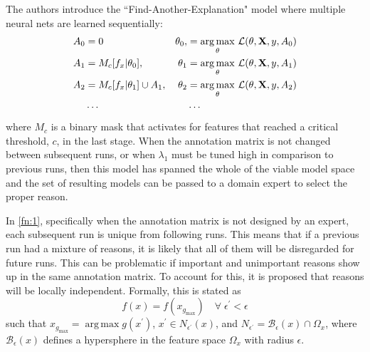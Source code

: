 \documentclass[twoside,11pt]{article}
\DeclareMathOperator*{\argmax}{arg\,max}
\begin{document}
The authors introduce the ``Find-Another-Explanation" model where multiple neural nets are learned sequentially:
\begin{align*}
A_0 & = 0 & \theta_0, & = \argmax_\theta \, \mathcal{L}(\theta, \vb{X}, y, A_0)\\
A_1 & = M_c[f_x|\theta_0], & \theta_1 & = \argmax_\theta \, \mathcal{L}(\theta, \vb{X}, y, A_1)\\
A_2 & = M_c[f_x|\theta_1]\cup A_1, & \theta_2 & = \argmax_\theta \, \mathcal{L}(\theta, \vb{X}, y, A_2)\\
&\cdots & &\cdots
\end{align*}
where $M_c$ is a binary mask that activates for features that reached a critical threshold, $c$, in the last stage. When the annotation matrix is not changed between subsequent runs, or when $\lambda_1$ must be tuned high in comparison to previous runs, then this model has spanned the whole of the viable model space and the set of resulting models can be passed to a  domain expert to select the proper reason. 

In \cref{fn:1}, specifically when the annotation matrix is not designed by an expert, each subsequent run is unique from following runs. This means that if a previous run had a mixture of reasons, it is likely that all of them will be disregarded for future runs. This can be problematic if important and unimportant reasons show up in the same annotation matrix. To account for this, it is proposed that reasons will be locally independent. Formally, this is stated as 
\[f(x) = f(x_{g_\text{max}}) \quad \forall \; \epsilon^\prime < \epsilon\]
such that $x_{g_\text{max}} = \argmax g(x^\prime)$, $x^\prime \in N_{\epsilon^\prime}(x)$, and $N_{\epsilon^\prime} = \mathcal{B}_\epsilon(x) \cap \Omega_x$, where $\mathcal{B}_\epsilon(x)$ defines a hypersphere in the feature space $\Omega_x$ with radius $\epsilon$. 
\end{document}
